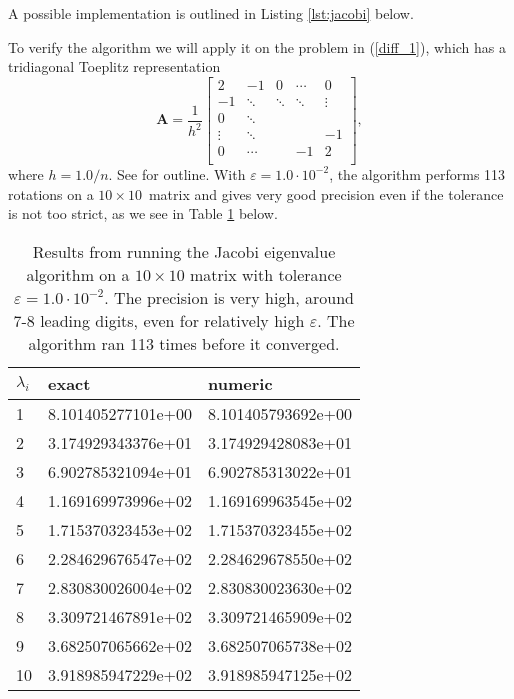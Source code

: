 \documentclass[]{article}
\begin{document}
A possible implementation is outlined in Listing \ref{lst:jacobi} below. 

To verify the algorithm we will apply it on the problem in (\ref{diff_1}), which has a tridiagonal Toeplitz representation 
\begin{equation*}
\mathbf{A} = 
\frac{1}{h^2}
\begin{bmatrix}
2		& -1			& 0				& \cdots 	& 0 \\
-1		& \ddots		& \ddots		& \ddots 	& \vdots \\
0		& \ddots		& 				& 		 	& \\
\vdots	& \ddots		& 				& 		 	& -1 \\
0		& \cdots		& 				& -1 		& 2 \\

\end{bmatrix},
\end{equation*}
where $h = 1.0/n$. See \cite{fys4150-p2} for outline. With $\varepsilon = 1.0 \cdot 10^{-2}$, the algorithm performs 113 rotations on a $10 \times 10$ matrix and gives very good precision even if the tolerance is not too strict, as we see in Table \ref{tab:toeplitz_methods} below.
\begin{table}[ht]
	\caption{Results from running the Jacobi eigenvalue algorithm on a $10 \times 10$ matrix with tolerance $\varepsilon = 1.0 \cdot 10^{-2}$. The precision is very high, around 7-8 leading digits, even for relatively high $\varepsilon$. The algorithm ran 113 times before it converged.}
	\label{tab:toeplitz_methods}
	\begin{center}
		\begin{tabular}{lll}
			\toprule
			$\lambda_i$ &              exact &            numeric \\
			\midrule
				1 & 8.101405277101e+00 & 8.101405793692e+00 \\
				2 & 3.174929343376e+01 & 3.174929428083e+01 \\
				3 & 6.902785321094e+01 & 6.902785313022e+01 \\
				4 & 1.169169973996e+02 & 1.169169963545e+02 \\
				5 & 1.715370323453e+02 & 1.715370323455e+02 \\
				6 & 2.284629676547e+02 & 2.284629678550e+02 \\
				7 & 2.830830026004e+02 & 2.830830023630e+02 \\
				8 & 3.309721467891e+02 & 3.309721465909e+02 \\
				9 & 3.682507065662e+02 & 3.682507065738e+02 \\
				10 & 3.918985947229e+02 & 3.918985947125e+02 \\
			\bottomrule
		\end{tabular}
	\end{center}
\end{table}
\end{document}
